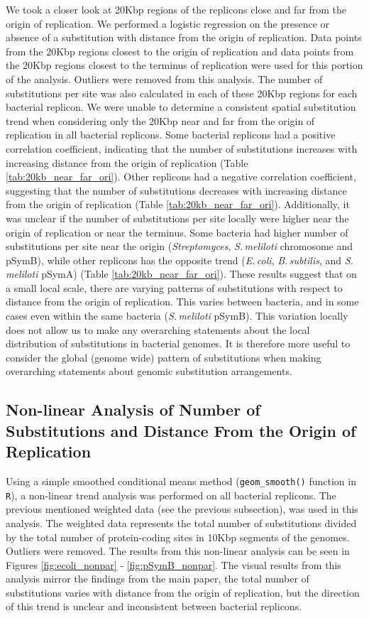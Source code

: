 \documentclass[11pt]{article}
\newcommand{\smel}{\textit{S.\,meliloti}\xspace}
\newcommand{\strep}{\textit{Streptomyces}\xspace}
\newcommand{\ecol}{\textit{E.\,coli}\xspace}
\newcommand{\bass}{\textit{B.\,subtilis}\xspace}
\newcommand{\pa}{pSymA\xspace}
\newcommand{\pb}{pSymB\xspace}
\begin{document}
We took a closer look at 20Kbp regions of the replicons close and far from the origin of replication.
We performed a logistic regression on the presence or absence of a substitution with distance from the origin of replication.
Data points from the 20Kbp regions closest to the origin of replication and data points from the 20Kbp regions closest to the terminus of replication were used for this portion of the analysis.
Outliers were removed from this analysis.
The number of substitutions per site was also calculated in each of these 20Kbp regions for each bacterial replicon.
We were unable to determine a consistent spatial substitution trend when considering only the 20Kbp near and far from the origin of replication in all bacterial replicons.
Some bacterial replicons had a positive correlation coefficient, indicating that the number of substitutions increases with increasing distance from the origin of replication (Table \ref{tab:20kb_near_far_ori}).
Other replicons had a negative correlation coefficient, suggesting that the number of substitutions decreases with increasing distance from the origin of replication (Table \ref{tab:20kb_near_far_ori}).
Additionally, it was unclear if the number of substitutions per site locally were higher near the origin of replication or near the terminus.
Some bacteria had higher number of substitutions per site near the origin (\strep, \smel chromosome and \pb), while other replicons has the opposite trend (\ecol, \bass, and \smel \pa) (Table \ref{tab:20kb_near_far_ori}).
These results suggest that on a small local scale, there are varying patterns of substitutions with respect to distance from the origin of replication.
This varies between bacteria, and in some cases even within the same bacteria (\smel \pb).
This variation locally does not allow us to make any overarching statements about the local distribution of substitutions in bacterial genomes.
It is therefore more useful to consider the global (genome wide) pattern of substitutions when making overarching statements about genomic substitution arrangements.




\subsection{Non-linear Analysis of Number of Substitutions and Distance From the Origin of Replication}

Using a simple smoothed conditional means method (\texttt{geom\_smooth()} function in \texttt{R}), a non-linear trend analysis was performed on all bacterial replicons.
The previous mentioned weighted data (see the previous subsection), was used in this analysis.
The weighted data represents the total number of substitutions divided by the total number of protein-coding sites in 10Kbp segments of the genomes.
Outliers were removed.
The results from this non-linear analysis can be seen in Figures \ref{fig:ecoli_nonpar} - \ref{fig:pSymB_nonpar}.
The visual results from this analysis mirror the findings from the main paper, the total number of substitutions varies with distance from the origin of replication, but the direction of this trend is unclear and inconsistent between bacterial replicons.
 
\end{document}
